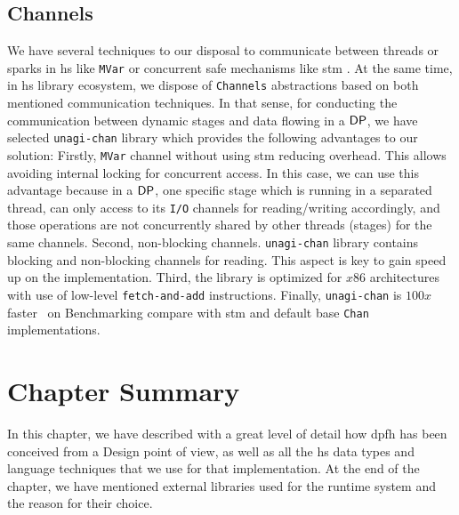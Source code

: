 \subsection{Channels\label{section:channels}} 
We have several techniques to our disposal to communicate between threads or sparks in \acrshort{hs} like \texttt{MVar} or concurrent safe mechanisms like \acrfull{stm} \cite{stm}. At the same time, in \acrshort{hs} library ecosystem, we dispose of \texttt{Channels} abstractions based on both mentioned communication techniques. In that sense, for conducting the communication between dynamic stages and data flowing in a $\mathsf{DP}$, we have selected \texttt{unagi-chan} library \cite{unagi} which provides the following advantages to our solution: Firstly,  \texttt{MVar} channel without using \acrshort{stm} reducing overhead. This allows avoiding internal locking for concurrent access. 
In this case, we can use this advantage because in a $\mathsf{DP}$, one specific stage which is running in a separated thread, can only access to its \texttt{I/O} channels for reading/writing accordingly, and those operations are not concurrently shared by other threads (stages) for the same channels. Second,  non-blocking channels. \texttt{unagi-chan} library contains blocking and non-blocking channels for reading. This aspect is key to gain speed up on the implementation. Third, the library is optimized for $x86$ architectures with use of low-level \texttt{fetch-and-add} instructions. Finally, \texttt{unagi-chan} is $100x$ faster~\cite{unagi-bench} on Benchmarking compare with \acrshort{stm} and default base \texttt{Chan} implementations.

\section{Chapter Summary}
In this chapter, we have described with a great level of detail how \acrlong{dpfh} has been conceived from a Design point of view, 
as well as all the \acrshort{hs} data types and language techniques that we use for that implementation. 
At the end of the chapter, we have mentioned external libraries used for the runtime system and the reason for their choice.
